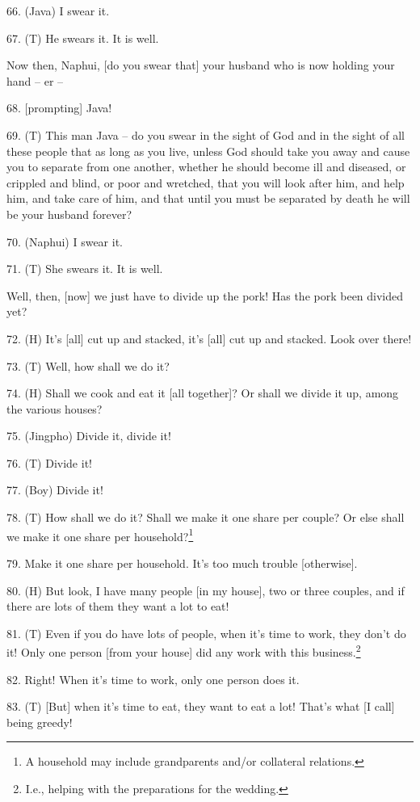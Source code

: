 66. (Java) I swear it.

67. (T) He swears it. It is well.

Now then, Naphui, [do you swear that] your husband who is now holding your hand
-- er --

68. [prompting] Java!

69. (T) This man Java -- do you swear in the sight of God and in the sight of all
these people that as long as you live, unless God should take you away and cause
you to separate from one another, whether he should become ill and diseased, or
crippled and blind, or poor and wretched, that you will look after him, and help
him, and take care of him, and that until you must be separated by death he will
be your husband forever?

70. (Naphui) I swear it.

71. (T) She swears it. It is well.

Well, then, [now] we just have to divide up the pork! Has the pork been divided
yet?

72. (H) It's [all] cut up and stacked, it's [all] cut up and stacked. Look over
there!

73. (T) Well, how shall we do it?

74. (H) Shall we cook and eat it [all together]? Or shall we divide it up, among
the various houses?

75. (Jingpho) Divide it, divide it!

76. (T) Divide it!

77. (Boy) Divide it!

78. (T) How shall we do it? Shall we make it one share per couple? Or else shall
we make it one share per household?\footnote{A household may include grandparents and/or collateral relations.}

79. Make it one share per household. It's too much trouble [otherwise].

80. (H) But look, I have many people [in my house], two or three couples, and if
there are lots of them they want a lot to eat!

81. (T) Even if you do have lots of people, when it's time to work, they don't
do it! Only one person [from your house] did any work with this business.\footnote{I.e., helping with the preparations for the wedding.}

82. Right! When it's time to work, only one person does it.

83. (T) [But] when it's time to eat, they want to eat a lot! That's what [I call]
being greedy!

